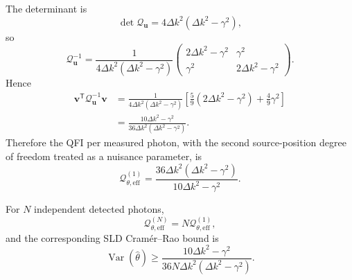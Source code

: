 {The determinant is
\[
\det \mathcal Q_{\boldsymbol u}
=4\Delta k^2(\Delta k^2-\gamma^2),
\]
so
\[
\mathcal Q_{\boldsymbol u}^{-1}
=
\frac{1}{4\Delta k^2(\Delta k^2-\gamma^2)}
\begin{pmatrix}
2\Delta k^2-\gamma^2 & \gamma^2\\[3pt]
\gamma^2 & 2\Delta k^2-\gamma^2
\end{pmatrix}.
\]
Hence
\[
\begin{aligned}
\boldsymbol v^\mathsf T
\mathcal Q_{\boldsymbol u}^{-1}
\boldsymbol v
&=
\frac{1}{4\Delta k^2(\Delta k^2-\gamma^2)}
\left[
\frac{5}{9}(2\Delta k^2-\gamma^2)
+\frac{4}{9}\gamma^2
\right]\\[3pt]
&=
\frac{10\Delta k^2-\gamma^2}
{36\Delta k^2(\Delta k^2-\gamma^2)}.
\end{aligned}
\]
Therefore the QFI per measured photon, with the second source-position degree of freedom treated as a nuisance parameter, is
\[
\boxed{
\mathcal Q_{\theta,\mathrm{eff}}^{(1)}
=
\frac{36\Delta k^2(\Delta k^2-\gamma^2)}
{10\Delta k^2-\gamma^2}
}.
\]

For $N$ independent detected photons,
\[
\mathcal Q_{\theta,\mathrm{eff}}^{(N)}
=N\mathcal Q_{\theta,\mathrm{eff}}^{(1)},
\]
and the corresponding SLD Cram\'er--Rao bound is
\[
\operatorname{Var}(\hat\theta)
\ge
\frac{10\Delta k^2-\gamma^2}
{36N\Delta k^2(\Delta k^2-\gamma^2)}.
\]

}